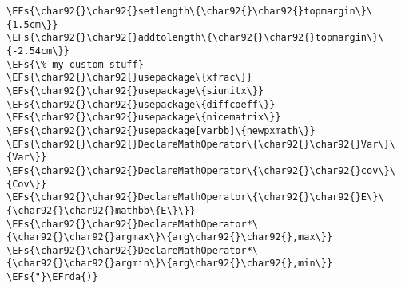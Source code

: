 \documentclass[12pt]{article}
\theoremstyle{plain}%
\theoremstyle{definition}
\theoremstyle{remark}
\newcommand{\EFs}[1]{\textcolor{EFs}{#1}} %
\newcommand{\EFrda}[1]{\textcolor{EFrda}{#1}} %
\begin{document}
\begin{enumerate}
\begin{Code}
\begin{Verbatim}
\EFs{\char92{}\char92{}setlength\{\char92{}\char92{}topmargin\}\{1.5cm\}}
\EFs{\char92{}\char92{}addtolength\{\char92{}\char92{}topmargin\}\{-2.54cm\}}
\EFs{\% my custom stuff}
\EFs{\char92{}\char92{}usepackage\{xfrac\}}
\EFs{\char92{}\char92{}usepackage\{siunitx\}}
\EFs{\char92{}\char92{}usepackage\{diffcoeff\}}
\EFs{\char92{}\char92{}usepackage\{nicematrix\}}
\EFs{\char92{}\char92{}usepackage[varbb]\{newpxmath\}}
\EFs{\char92{}\char92{}DeclareMathOperator\{\char92{}\char92{}Var\}\{Var\}}
\EFs{\char92{}\char92{}DeclareMathOperator\{\char92{}\char92{}cov\}\{Cov\}}
\EFs{\char92{}\char92{}DeclareMathOperator\{\char92{}\char92{}E\}\{\char92{}\char92{}mathbb\{E\}\}}
\EFs{\char92{}\char92{}DeclareMathOperator*\{\char92{}\char92{}argmax\}\{arg\char92{}\char92{},max\}}
\EFs{\char92{}\char92{}DeclareMathOperator*\{\char92{}\char92{}argmin\}\{arg\char92{}\char92{},min\}}
\EFs{"}\EFrda{)}
\end{Verbatim}
\end{Code}
\end{enumerate}
\end{document}
